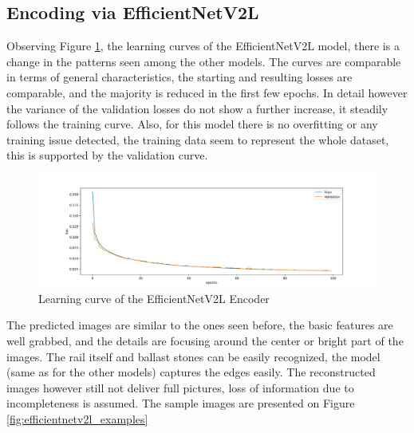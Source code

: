 \subsection{Encoding via EfficientNetV2L}
Observing Figure \ref{fig:efficientnetv2l_learning_curve}, the learning curves of the
EfficientNetV2L model, there is a change in the patterns seen among the other models.
The curves are comparable in terms of general characteristics, the starting and resulting losses are
comparable, and the majority is reduced in the first few epochs.
In detail however the variance of the validation losses do not show a further increase,
it steadily follows the training curve.
Also, for this model there is no overfitting or any training issue detected, the training data
seem to represent the whole dataset, this is supported by the validation curve.

\begin{figure}[H]
    \centering
    \includegraphics[width=\textwidth,trim={0 0 0 1cm},clip]{./results/efficientnetv2l_vgg19/20230525_194238_results.png}
    \caption{Learning curve of the EfficientNetV2L Encoder}
    \label{fig:efficientnetv2l_learning_curve}
\end{figure}

The predicted images are similar to the ones seen before, the basic features are well grabbed, and
the details are focusing around the center or bright part of the images.
The rail itself and ballast stones can be easily recognized, the model (same as for the other models)
captures the edges easily.
The reconstructed images however still not deliver full pictures, loss of information due to
incompleteness is assumed.
The sample images are presented on Figure \ref{fig:efficientnetv2l_examples}

